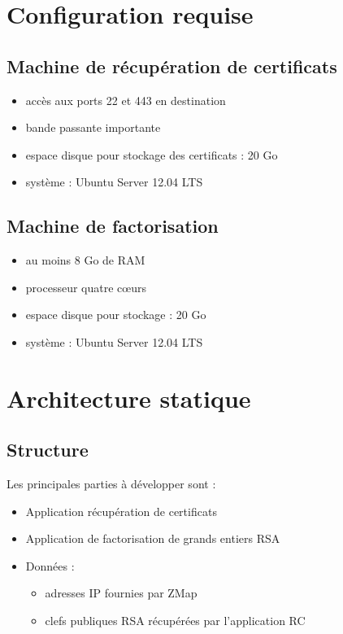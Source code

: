 \documentclass[a4paper,11pt,french]{article}
\begin{document}
\section{Configuration requise}
\subsection{Machine de récupération de certificats}
\begin{itemize}
\item accès aux ports 22 et 443 en destination
\item bande passante importante
\item espace disque pour stockage des certificats : 20 Go
\item système : Ubuntu Server 12.04 LTS
\end{itemize}

\subsection{Machine de factorisation}
\begin{itemize}
\item au moins 8 Go de RAM
\item processeur quatre cœurs
\item espace disque pour stockage : 20 Go
\item système : Ubuntu Server 12.04 LTS
\end{itemize}

\section{Architecture statique}

\subsection{Structure}
Les principales parties à développer sont :
\begin{itemize}
\item Application récupération de certificats
\item Application de factorisation de grands entiers RSA
\item Données :
\begin{itemize}
\item adresses IP fournies par ZMap
\item clefs publiques RSA récupérées par l'application RC
\end{itemize}
\end{itemize}
\end{document}
